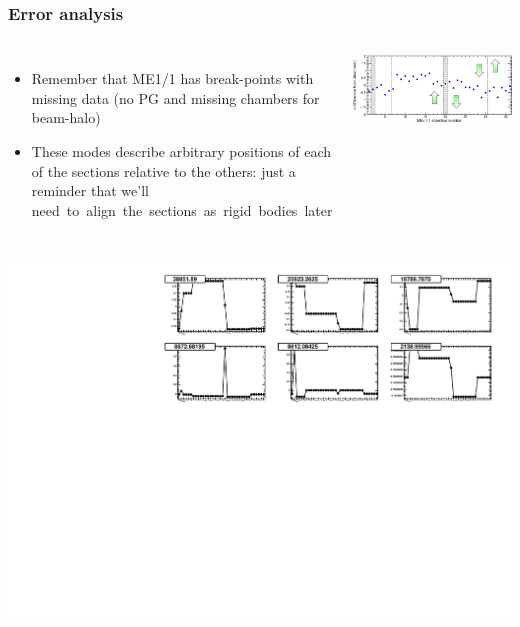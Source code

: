 \documentclass[compress]{beamer}
\begin{document}
\begin{frame}
\frametitle{Error analysis}

\begin{columns}

\begin{itemize}
\item Remember that ME1/1 has break-points with missing data (no PG
  and missing chambers for beam-halo)
\item These modes describe arbitrary positions of each of the sections
  relative to the others: just a reminder that we'll \mbox{need to align the sections as rigid bodies later\hspace{-5 cm}}
\end{itemize}

\includegraphics[width=\linewidth]{dependence_on_weights_p11.png}
\end{columns}

\vspace{0.25 cm}
\includegraphics[width=\linewidth]{errormodes_pgnormal_p11_first6.pdf}
\end{frame}
\end{document}
